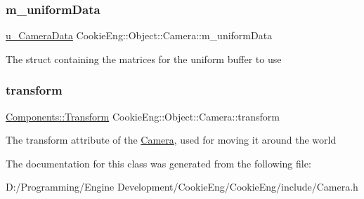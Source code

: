 \subsubsection{\texorpdfstring{m\+\_\+uniform\+Data}{m\_uniformData}}
{\footnotesize\ttfamily \hyperlink{struct_cookie_eng_1_1_object_1_1u___camera_data}{u\+\_\+\+Camera\+Data} Cookie\+Eng\+::\+Object\+::\+Camera\+::m\+\_\+uniform\+Data\hspace{0.3cm}{\ttfamily [protected]}}

The struct containing the matrices for the uniform buffer to use \mbox{\label{class_cookie_eng_1_1_object_1_1_camera_aa996e685c79a71bd30e88341b68ed197}} 
\subsubsection{\texorpdfstring{transform}{transform}}
{\footnotesize\ttfamily \hyperlink{class_cookie_eng_1_1_components_1_1_transform}{Components\+::\+Transform} Cookie\+Eng\+::\+Object\+::\+Camera\+::transform}

The transform attribute of the \hyperlink{class_cookie_eng_1_1_object_1_1_camera}{Camera}, used for moving it around the world 

The documentation for this class was generated from the following file\+:\begin{DoxyCompactItemize}
\item 
D\+:/\+Programming/\+Engine Development/\+Cookie\+Eng/\+Cookie\+Eng/include/Camera.\+h\end{DoxyCompactItemize}
